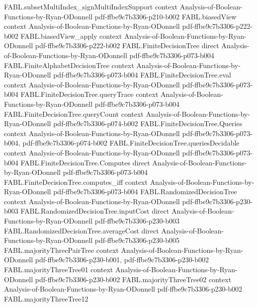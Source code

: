 \begin{theorem}
\proofstep
  {FABL.subsetMultiIndex_signMultiIndexSupport}
  {context}
  {Analysis-of-Boolean-Functions-by-Ryan-ODonnell}
  {pdf-ffbe9c7b3306-p210-b002}
\proofstep
  {FABL.biasedView}
  {context}
  {Analysis-of-Boolean-Functions-by-Ryan-ODonnell}
  {pdf-ffbe9c7b3306-p222-b002}
\proofstep
  {FABL.biasedView_apply}
  {context}
  {Analysis-of-Boolean-Functions-by-Ryan-ODonnell}
  {pdf-ffbe9c7b3306-p222-b002}
\proofstep
  {FABL.FiniteDecisionTree}
  {direct}
  {Analysis-of-Boolean-Functions-by-Ryan-ODonnell}
  {pdf-ffbe9c7b3306-p073-b004}
\proofstep
  {FABL.FiniteAlphabetDecisionTree}
  {context}
  {Analysis-of-Boolean-Functions-by-Ryan-ODonnell}
  {pdf-ffbe9c7b3306-p073-b004}
\proofstep
  {FABL.FiniteDecisionTree.eval}
  {context}
  {Analysis-of-Boolean-Functions-by-Ryan-ODonnell}
  {pdf-ffbe9c7b3306-p073-b004}
\proofstep
  {FABL.FiniteDecisionTree.queryTrace}
  {context}
  {Analysis-of-Boolean-Functions-by-Ryan-ODonnell}
  {pdf-ffbe9c7b3306-p073-b004}
\proofstep
  {FABL.FiniteDecisionTree.queryCount}
  {context}
  {Analysis-of-Boolean-Functions-by-Ryan-ODonnell}
  {pdf-ffbe9c7b3306-p074-b002}
\proofstep
  {FABL.FiniteDecisionTree.Queries}
  {context}
  {Analysis-of-Boolean-Functions-by-Ryan-ODonnell}
  {pdf-ffbe9c7b3306-p073-b004,
    pdf-ffbe9c7b3306-p074-b002}
\proofstep
  {FABL.FiniteDecisionTree.queriesDecidable}
  {context}
  {Analysis-of-Boolean-Functions-by-Ryan-ODonnell}
  {pdf-ffbe9c7b3306-p073-b004}
\proofstep
  {FABL.FiniteDecisionTree.Computes}
  {direct}
  {Analysis-of-Boolean-Functions-by-Ryan-ODonnell}
  {pdf-ffbe9c7b3306-p073-b004}
\proofstep
  {FABL.FiniteDecisionTree.computes_iff}
  {context}
  {Analysis-of-Boolean-Functions-by-Ryan-ODonnell}
  {pdf-ffbe9c7b3306-p073-b004}
\proofstep
  {FABL.RandomizedDecisionTree}
  {context}
  {Analysis-of-Boolean-Functions-by-Ryan-ODonnell}
  {pdf-ffbe9c7b3306-p230-b003}
\proofstep
  {FABL.RandomizedDecisionTree.inputCost}
  {direct}
  {Analysis-of-Boolean-Functions-by-Ryan-ODonnell}
  {pdf-ffbe9c7b3306-p230-b003}
\proofstep
  {FABL.RandomizedDecisionTree.averageCost}
  {direct}
  {Analysis-of-Boolean-Functions-by-Ryan-ODonnell}
  {pdf-ffbe9c7b3306-p230-b005}
\proofstep
  {FABL.majorityThreePairTree}
  {context}
  {Analysis-of-Boolean-Functions-by-Ryan-ODonnell}
  {pdf-ffbe9c7b3306-p230-b001,
    pdf-ffbe9c7b3306-p230-b002}
\proofstep
  {FABL.majorityThreeTree01}
  {context}
  {Analysis-of-Boolean-Functions-by-Ryan-ODonnell}
  {pdf-ffbe9c7b3306-p230-b002}
\proofstep
  {FABL.majorityThreeTree02}
  {context}
  {Analysis-of-Boolean-Functions-by-Ryan-ODonnell}
  {pdf-ffbe9c7b3306-p230-b002}
\proofstep
  {FABL.majorityThreeTree12}

\end{theorem}
